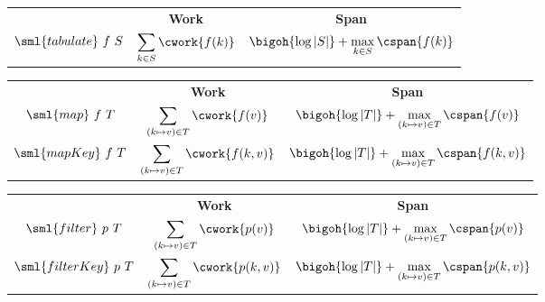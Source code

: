 \begin{cluster}
\label{grp:cst:treap-aug-table::tabulate}

\begin{costspec}[Tabulate]
\label{cst:treap-aug-table::tabulate}
\begin{tabular}{c|c|c}
& \textbf{Work} & \textbf{Span} \\
$\sml{tabulate}~f~S$ &
$\displaystyle\sum_{k \in S} \cwork {f(k)}$ &
$\bigoh{\log|S|} + \displaystyle\max_{k \in S} \cspan{f(k)}$
\end{tabular}

\end{costspec}
\end{cluster}

\begin{cluster}
\label{grp:cst:treap-aug-table::map}

\begin{costspec}[Map]
\label{cst:treap-aug-table::map}
\begin{tabular}{c|c|c}
& \textbf{Work} & \textbf{Span} \\
$\sml{map}~f~T$ &
$\displaystyle\sum_{(k \mapsto v) \in T} \cwork {f(v)}$ &
$\bigoh{\log|T|} + \displaystyle\max_{(k \mapsto v) \in T} \cspan{f(v)}$
\\
$\sml{mapKey}~f~T$ &
$\displaystyle\sum_{(k \mapsto v) \in T} \cwork {f(k,v)}$ &
$\bigoh{\log|T|} + \displaystyle\max_{(k \mapsto v) \in T} \cspan{f(k,v)}$
\end{tabular}

\end{costspec}
\end{cluster}

\begin{cluster}
\label{grp:cst:treap-aug-table::filter}

\begin{costspec}[Filter]
\label{cst:treap-aug-table::filter}
\begin{tabular}{c|c|c}
& \textbf{Work} & \textbf{Span} \\
$\sml{filter}~p~T$ &
$\displaystyle\sum_{(k \mapsto v) \in T} \cwork {p(v)}$ &
$\bigoh{\log|T|} + \displaystyle\max_{(k \mapsto v) \in T} \cspan{p(v)}$
\\
$\sml{filterKey}~p~T$ &
$\displaystyle\sum_{(k \mapsto v) \in T} \cwork {p(k,v)}$ &
$\bigoh{\log|T|} + \displaystyle\max_{(k \mapsto v) \in T} \cspan{p(k,v)}$
\end{tabular}

\end{costspec}
\end{cluster}

